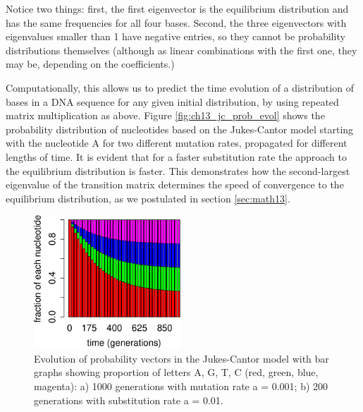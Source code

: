 \documentclass[
  letterpaper,
  DIV=11,
  numbers=noendperiod]{scrreprt}
\begin{document}
Notice two things: first, the first eigenvector is the equilibrium
distribution and has the same frequencies for all four bases. Second,
the three eigenvectors with eigenvalues smaller than 1 have negative
entries, so they cannot be probability distributions themselves
(although as linear combinations with the first one, they may be,
depending on the coefficients.)

Computationally, this allows us to predict the time evolution of a
distribution of bases in a DNA sequence for any given initial
distribution, by using repeated matrix multiplication as above. Figure
\ref{fig:ch13_jc_prob_evol} shows the probability distribution of
nucleotides based on the Jukes-Cantor model starting with the nucleotide
A for two different mutation rates, propagated for different lengths of
time. It is evident that for a faster substitution rate the approach to
the equilibrium distribution is faster. This demonstrates how the
second-largest eigenvalue of the transition matrix determines the speed
of convergence to the equilibrium distribution, as we postulated in
section \ref{sec:math13}.

\begin{figure}

{\centering \includegraphics[width=0.49\textwidth,height=\textheight]{./markov_eigen_files/figure-pdf/bio14-1-1.pdf}

}

\caption{Evolution of probability vectors in the Jukes-Cantor model with
bar graphs showing proportion of letters A, G, T, C (red, green, blue,
magenta): a) 1000 generations with mutation rate a = 0.001; b) 200
generations with substitution rate a = 0.01.}

\end{figure}
\end{document}
